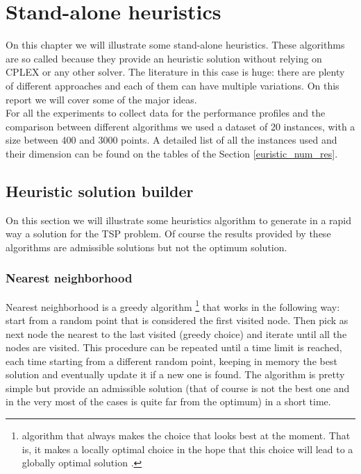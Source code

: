 \chapter{Stand-alone heuristics}
On this chapter we will illustrate some stand-alone heuristics. These algorithms are so called because they provide an heuristic solution without relying on CPLEX or any other solver. The literature in this case is huge: there are plenty of different approaches and each of them can have multiple variations. On this report we will cover some of the major ideas. \\
For all the experiments to collect data for the performance profiles and the comparison between different algorithms we used a dataset of 20 instances, with a size between 400 and 3000 points. A detailed list of all the instances used and their dimension can be found on the tables of the Section \ref{euristic_num_res}.

\section{Heuristic solution builder}
On this section we will illustrate some heuristics algorithm to generate in a rapid way a solution for the TSP problem. Of course the results provided by these algorithms are admissible solutions but not the optimum solution.

\subsection{Nearest neighborhood}
Nearest neighborhood is a greedy algorithm \footnote{algorithm that always makes the choice that looks best at the moment. That is, it makes a locally optimal choice in the hope that this choice
will lead to a globally optimal solution \cite{10.5555/1614191}.	 
} that works in the following way: start from a random point that is considered the first visited node. Then pick as next node the nearest to the last visited (greedy choice) and iterate until all the nodes are visited. This procedure can be repeated until a time limit is reached, each time starting from a different random point, keeping in memory the best solution and eventually update it if a new one is found. The algorithm is pretty simple but provide an admissible solution (that of course is not the best one and in the very most of the cases is quite far from the optimum) in a short time. \\

